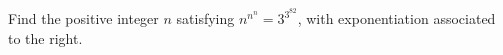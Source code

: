 Find the positive integer $n$ satisfying $n^{n^n}=3^{3^{82}}$, with exponentiation associated to the right.
